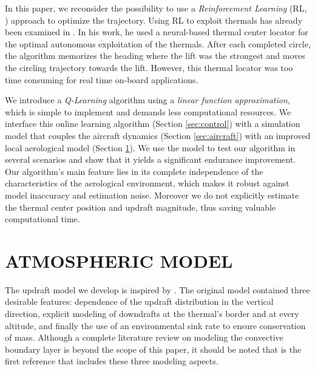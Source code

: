 \documentclass[a4paper, 10pt, conference]{ieeeconf}
\begin{document}
In {\color{red}this paper}, we reconsider the possibility to use a \emph{Reinforcement Learning} (RL, \cite{sutton_book}) approach to optimize the trajectory. Using RL to exploit thermals has already been examined in \cite{wharington_phd}. In his work, he used a neural-based thermal center locator for the optimal autonomous exploitation of the thermals. After each completed circle, the algorithm memorizes the heading where the lift was the strongest {\color{red}and moves} the circling trajectory towards the lift. However, this thermal locator was too time consuming for real time on-board applications.

We introduce a \emph{Q-Learning} algorithm using a \emph{linear function approximation}, which is simple to implement and demands less computational resources.
We interface this online learning algorithm (Section \ref{sec:control}) with a simulation model that couples the aircraft dynamics (Section \ref{sec:aircraft}) with an improved local aerological model (Section \ref{sec:atmos}).
We use the model to {\color{red}test} our algorithm in several scenarios and show that it yields a significant endurance improvement. Our algorithm's main feature lies in its complete independence of the characteristics of {\color{red}the aerological environment}, which makes it robust against model inaccuracy and estimation noise. Moreover we do not explicitly estimate the thermal center position and updraft magnitude, thus saving valuable computational time.

\section{ATMOSPHERIC MODEL}
\label{sec:atmos}

The updraft model we develop is inspired by \cite{allen_thermal}. The original model contained three desirable features: dependence of the updraft distribution in the vertical direction, explicit modeling of downdrafts at the thermal's border and at every altitude, and finally the use of an environmental sink rate to ensure conservation of mass. Although a complete literature review on modeling the convective boundary layer is beyond the scope of this paper, it should be noted that \cite{allen_thermal} is the first reference that includes these three modeling aspects.
\end{document}
